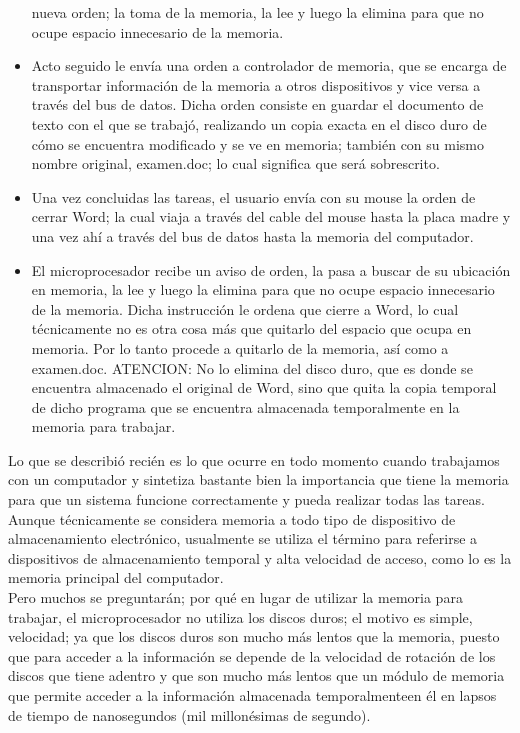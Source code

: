 \documentclass{article}
\begin{document}
\begin{itemize}
nueva orden; la toma de la memoria, la lee y luego la elimina para que no ocupe espacio
innecesario de la memoria.
\item Acto seguido le envía una orden a controlador de memoria, que se encarga de transportar
información de la memoria a otros dispositivos y vice versa a través del bus de datos. Dicha
orden consiste en guardar el documento de texto con el que se trabajó, realizando un copia
exacta en el disco duro de cómo se encuentra modificado y se ve en memoria; también con
su mismo nombre original, examen.doc; lo cual significa que será sobrescrito.
\item Una vez concluidas las tareas, el usuario envía con su mouse la orden de cerrar Word; la
cual viaja a través del cable del mouse hasta la placa madre y una vez ahí a través del bus
de datos hasta la memoria del computador.
\item El microprocesador recibe un aviso de orden, la pasa a buscar de su ubicación en memoria,
la lee y luego la elimina para que no ocupe espacio innecesario de la memoria. Dicha
instrucción le ordena que cierre a Word, lo cual técnicamente no es otra cosa más que
quitarlo del espacio que ocupa en memoria. Por lo tanto procede a quitarlo de la memoria,
así como a examen.doc. ATENCION: No lo elimina del disco duro, que es donde se
encuentra almacenado el original de Word, sino que quita la copia temporal de dicho
programa que se encuentra almacenada temporalmente en la memoria para
trabajar.
\end{itemize}
Lo que se describió recién es lo que ocurre en todo momento cuando trabajamos con un
computador y sintetiza bastante bien la importancia que tiene la memoria para que un sistema
funcione correctamente y pueda realizar todas las tareas.\\[0.1cm]
Aunque técnicamente se considera memoria a todo tipo de dispositivo de almacenamiento
electrónico, usualmente se utiliza el término para referirse a dispositivos de almacenamiento
temporal y alta velocidad de acceso, como lo es la memoria principal del computador.\\[0.1cm]
Pero muchos se preguntarán; por qué en lugar de utilizar la memoria para trabajar, el
microprocesador no utiliza los discos duros; el motivo es simple, velocidad; ya que los discos
duros son mucho más lentos que la memoria, puesto que para acceder a la información se
depende de la velocidad de rotación de los discos que tiene adentro y que son mucho más lentos
que un módulo de memoria que permite acceder a la información almacenada temporalmenteen él en lapsos de tiempo de nanosegundos (mil millonésimas de segundo).\\[0.1cm]
\end{document}

